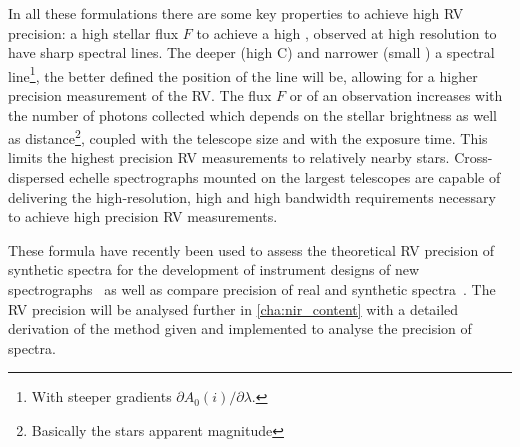 In all these formulations there are some key properties to achieve high RV precision: a high stellar flux $F$ to achieve a high \snr{}, observed at high resolution to have sharp spectral lines.
The deeper (high C) and narrower (small \fwhm{}) a spectral line\footnote{With steeper gradients $\partial A_0(i)/\partial\lambda$.}, the better defined the position of the line will be, allowing for a higher precision measurement of the RV.
The flux $F$ or \snr{} of an observation increases with the number of photons collected which depends on the stellar brightness as well as distance\footnote{Basically the stars apparent magnitude}, coupled with the telescope size and with the exposure time.
This limits the highest precision RV measurements to relatively nearby stars.
Cross-dispersed echelle spectrographs mounted on the largest telescopes are capable of delivering the high-resolution, high \snr{} and high bandwidth requirements necessary to achieve high precision RV measurements.

These formula have recently been used to assess the theoretical RV precision of synthetic spectra for the development of instrument designs of new \nir{} spectrographs~\citep[e.g.][]{figueira_radial_2016} as well as compare precision of real and synthetic spectra~\citep[e.g.][]{artigau_optical_2018}.
The RV precision will be analysed further in \cref{cha:nir_content} with a detailed derivation of the \citet{bouchy_fundamental_2001} method given and implemented to analyse the precision of \nir{} spectra.
